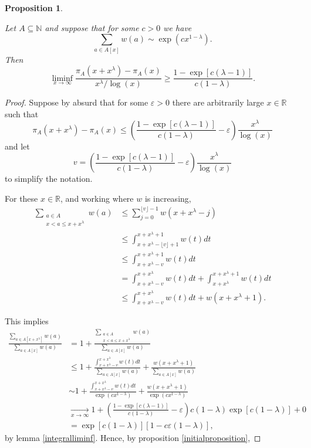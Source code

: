 \documentclass[11pt]{amsart}
\newtheorem{proposition}[theorem]{Proposition}
\numberwithin{equation}{section}
\newcommand{\N}{\mathbb{N}}
\newcommand{\R}{\mathbb{R}}
\newcommand{\pin}[1]{\lfloor #1 \rfloor}
\newcommand{\disum}{\displaystyle \sum}
\newcommand{\diint}{\displaystyle \int}
\newcommand{\difrac}{\displaystyle \frac}
\newcommand{\diliminf}{\displaystyle \liminf}
\begin{document}
\begin{proposition} \label{liminfproposition}

Let $A \subseteq \N$ and suppose that for some $c > 0$ we have $$\disum_{a \in A[x]} w(a) \sim \exp(cx^{1 - \lambda}).$$ Then $$\diliminf_{x \to \infty} \difrac{\pi_A(x + x^\lambda) - \pi_A(x)}{x^\lambda/\log(x)} \geq \difrac{1 - \exp[c(\lambda - 1)]}{c(1 - \lambda)}.$$

\end{proposition}

\begin{proof} Suppose by absurd that for some $\varepsilon > 0$ there are arbitrarily large $x \in \R$ such that $$\pi_A(x + x^\lambda) - \pi_A(x) \leq \left(\difrac{1 - \exp[c(\lambda - 1)]}{c(1 - \lambda)} - \varepsilon\right) \difrac{x^\lambda}{\log(x)}$$ and let $$v = \left(\difrac{1 - \exp[c(\lambda - 1)]}{c(1 - \lambda)} - \varepsilon\right) \difrac{x^\lambda}{\log(x)}$$ to simplify the notation.

For these $x \in \R$, and working where $w$ is increasing, \begin{equation*} \begin{split} \disum_{\substack{a \in A \\ x < a \leq x+x^\lambda}} w(a) & \leq \disum_{j = 0}^{\pin{v} - 1} w(x + x^\lambda - j) \\ & \leq \diint_{x + x^\lambda - \pin{v} + 1}^{x + x^\lambda + 1} w(t) dt \\ & \leq \diint_{x + x^\lambda - v}^{x + x^\lambda + 1} w(t) dt \\ & = \diint_{x + x^\lambda - v}^{x + x^\lambda} w(t) dt + \diint_{x + x^\lambda}^{x + x^\lambda + 1} w(t) dt \\ & \leq \diint_{x + x^\lambda - v}^{x + x^\lambda} w(t) dt + w(x + x^\lambda + 1). \end{split} \end{equation*}

This implies \begin{equation*} \begin{split} \difrac{\disum_{a \in A[x+x^\lambda]} w(a)}{\disum_{a \in A[x]} w(a)} & = 1 + \difrac{\disum_{\substack{a \in A \\ x < a \leq x+x^\lambda}} w(a)}{\disum_{a \in A[x]} w(a)} \\ & \leq 1 + \difrac{\diint_{x + x^\lambda - v}^{x + x^\lambda} w(t) dt}{\disum_{a \in A[x]} w(a)} + \difrac{w(x + x^\lambda + 1)}{\disum_{a \in A[x]} w(a)} \\ & \sim 1 + \difrac{\diint_{x + x^\lambda - v}^{x + x^\lambda} w(t) dt}{\exp(cx^{1 - \lambda})} + \difrac{w(x + x^\lambda + 1)}{\exp(cx^{1 - \lambda})} \\ & \xrightarrow[x \to \infty]{} 1 + \left(\difrac{1 - \exp[c(\lambda - 1)]}{c(1 - \lambda)} - \varepsilon\right)c(1 - \lambda)\exp[c(1 - \lambda)] + 0 \\ & = \exp[c(1 - \lambda)][1 - c\varepsilon(1 - \lambda)], \end{split} \end{equation*} by lemma \ref{integralliminf}. Hence, by proposition \ref{initialproposition},


\end{proof}
\end{document}
